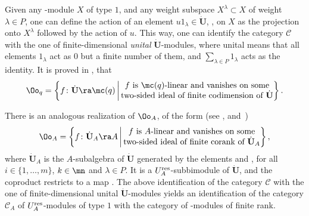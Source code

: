 Given any -module $X$ of type $1$, and any weight subspace $X^\lambda\subset X$ of weight $\lambda\in P$, one can define the action of an element $u 1_\lambda \in \dot{\mathbf{U}}$, , on $X$ as the projection onto $X^\lambda$ followed by the action of $u$. This way, one can identify the category $\mathcal{C}$ with the one of finite-dimensional {\it unital} $\dot{\mathbf{U}}$-modules, where unital means that all elements $1_\lambda$ act as $0$ but a finite number of them, and $ \sum_{\lambda\in P} 1_\lambda$ acts as the identity. It is proved in \cite[Section~29.5.1]{Lusztig}, that
\[%
\Oo_q = \left\lbrace f\colon \dot{\mathbf{U}} \ra \mc(q) \, \bigg\vert \, \begin{matrix} \text{$f$ is $\mc(q)$-linear and vanishes on some}\\ \text{two-sided ideal of finite codimension of $\dot{\mathbf{U}}$} \end{matrix}\right\rbrace.
\]

There is an analogous realization of $\Oo_A$, of the form (see \cite[Sections~23.2 and~29.5.2]{Lusztig}, and~\cite{Lusztig3})
\[%
\Oo_A = \left\lbrace f\colon \dot{\mathbf{U}}_A \ra A \, \bigg\vert \, \begin{matrix} \text{$f$ is $A$-linear and vanishes on some}\\ \text{two-sided ideal of finite corank of $\dot{\mathbf{U}}_A$} \end{matrix}\right\rbrace ,
\]
where $\dot{\mathbf{U}}_A$ is the $A$-subalgebra of $\dot{\mathbf{U}}$ generated by the elements  and , for all $i\in \{1,\dots,m\}$, $k\in \mn$ and $\lambda \in P$. It is a $U_A^{\rm res}$-subbimodule of $\dot{\mathbf{U}}$, and the coproduct restricts to a map . The above identification of the category $\mathcal{C}$ with the one of finite-dimensional unital $\dot{\mathbf{U}}$-modules yields an identification of the category $\mathcal{C}_A$ of $U_A^{\rm res}$-modules of type $1$ with the category of -modules of finite rank.

